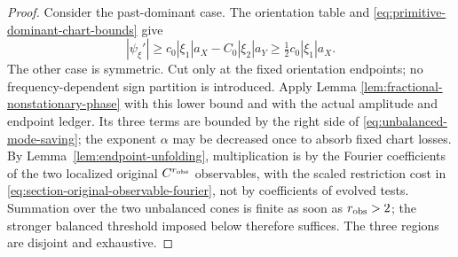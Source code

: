 \documentclass[11pt]{article}
\begin{document}
\begin{proof}
Consider the past-dominant case.  The orientation table and
\eqref{eq:primitive-dominant-chart-bounds} give
\[
 |\psi_\xi'|
 \ge c_0|\xi_1|a_X-C_0|\xi_2|a_Y
 \ge \tfrac12c_0|\xi_1|a_X.
\]
The other case is symmetric.  Cut only at the fixed orientation endpoints;
no frequency-dependent sign partition is introduced.  Apply Lemma
\ref{lem:fractional-nonstationary-phase} with this lower bound and with the
actual amplitude and endpoint ledger.  Its three terms are bounded by the
right side of \eqref{eq:unbalanced-mode-saving}; the exponent $\alpha$ may be
decreased once to absorb fixed chart losses.  By
Lemma~\ref{lem:endpoint-unfolding}, multiplication is by the Fourier
coefficients of the two localized original $C^{r_{\rm obs}}$ observables,
with the scaled restriction cost in
\eqref{eq:section-original-observable-fourier}, not by coefficients of
evolved tests.  Summation over the two
unbalanced cones is finite as soon as $r_{\rm obs}>2$; the stronger balanced
threshold imposed below therefore suffices.  The three regions are disjoint
and exhaustive.
\end{proof}
\end{document}

